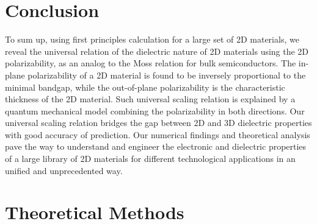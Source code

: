 \documentclass[journal=ancac3,manuscript=article,email=true,hyperref=true,keywords=false]{achemso}
\begin{document}
\section{Conclusion}
\label{sec:org5fd1f1a}
To sum up, using first principles calculation for a large set of 2D
materials, we reveal the universal relation of the dielectric nature
of 2D materials using the 2D polarizability, as an analog to the Moss
relation for bulk semiconductors. The in-plane polarizability of a 2D
material is found to be inversely proportional to the minimal bandgap,
while the out-of-plane polarizability is the characteristic thickness
of the 2D material. Such universal scaling relation is explained by a
quantum mechanical model combining the polarizability in both
directions. Our universal scaling relation bridges the gap between 2D
and 3D dielectric properties with good accuracy of prediction.  Our
numerical findings and theoretical analysis pave the way to understand
and engineer the electronic and dielectric properties of a large
library of 2D materials for different technological applications in an
unified and unprecedented way.

\section{Theoretical Methods}
\label{sec:org8457dbb}
\end{document}
